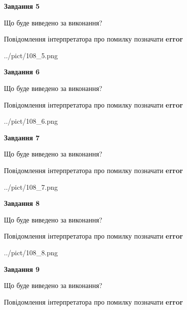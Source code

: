 \documentclass[11pt, ukrainian]{article}
\begin{document}
{\begin {large}
{\begin {center}\textbf{Завдання 5}\end {center}}\par
Що буде виведено за виконання? \par
Повідомлення інтерпретатора про помилку позначати \textbf{error}

\begin{center}
	{../pict/108_5.png}
\end{center}
\newpage

{\begin {center}\textbf{Завдання 6}\end {center}}\par
Що буде виведено за виконання? \par
Повідомлення інтерпретатора про помилку позначати \textbf{error}

\begin{center}
	{../pict/108_6.png}
\end{center}
\newpage

{\begin {center}\textbf{Завдання 7}\end {center}}\par
Що буде виведено за виконання? \par
Повідомлення інтерпретатора про помилку позначати \textbf{error}

\begin{center}
	{../pict/108_7.png}
\end{center}
\newpage

{\begin {center}\textbf{Завдання 8}\end {center}}\par
Що буде виведено за виконання? \par
Повідомлення інтерпретатора про помилку позначати \textbf{error}

\begin{center}
	{../pict/108_8.png}
\end{center}
\newpage

{\begin {center}\textbf{Завдання 9}\end {center}}\par
Що буде виведено за виконання? \par
Повідомлення інтерпретатора про помилку позначати \textbf{error}


\end{large}}
\end{document}
